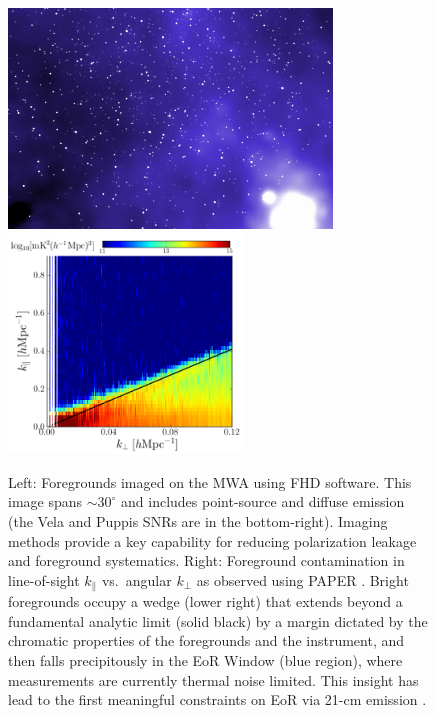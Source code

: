 \documentclass[preprint]{aastex}
\def\kperp{k_{\bot}}
\def\kpar{k_{\|}}
\begin{document}
\begin{figure}[t] \centering
\includegraphics[height=2.3in]{plots/MWApretty_crop.png} 
\includegraphics[height=2.3in]{plots/wedge_tall_wide.png} \caption{\small Left:
Foregrounds imaged on the MWA using FHD software.
This image spans $\sim$$30^{\circ}$ and
includes point-source and diffuse emission (the Vela and Puppis SNRs are in the
bottom-right). Imaging methods provide a key capability for reducing
polarization leakage and foreground systematics.  
Right: Foreground contamination in line-of-sight $\kpar$ vs.\ angular $\kperp$
as observed using PAPER \citep{pober_et_al2013}.
Bright foregrounds occupy
a wedge (lower right) that extends beyond a fundamental analytic limit
(solid black) by a margin dictated by the chromatic properties of the foregrounds
and the instrument, and then falls precipitously
in the EoR Window (blue
region), where measurements are currently thermal noise limited. This insight has lead to the
first meaningful constraints on EoR via 21-cm emission
\citep{parsons_et_al2013}.
}\label{fig:twoFGViews} \end{figure}
\end{document}
